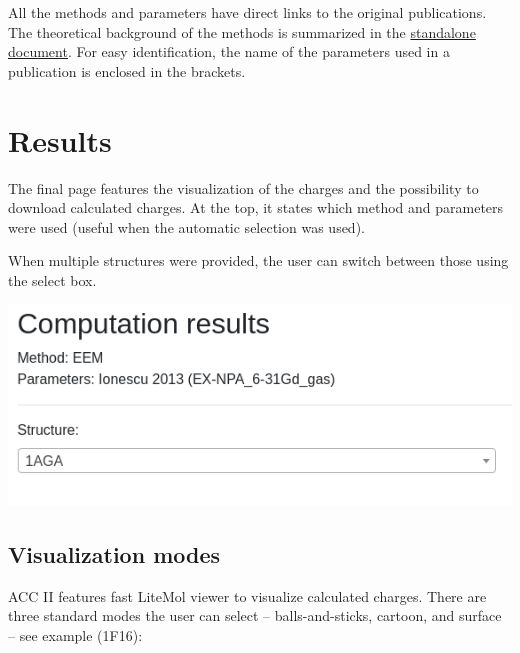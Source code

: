 \documentclass[oneside]{memoir}
\begin{document}
All the methods and parameters have direct links to the original publications. The theoretical background of the methods is summarized in the \href{https://acc2.ncbr.muni.cz/static/methods.pdf}{standalone document}. For easy identification, the name of the parameters used in a publication is enclosed in the brackets.

\section*{Results}
The final page features the visualization of the charges and the possibility to download calculated charges. At the top, it states which method and parameters were used (useful when the automatic selection was used).

When multiple structures were provided, the user can switch between those using the select box.

\begin{center}
    \includegraphics[width=.5\linewidth]{images/select.png}
\end{center}

\subsection*{Visualization modes}
ACC II features fast LiteMol viewer to visualize calculated charges. There are three standard modes the user can select – balls-and-sticks, cartoon, and surface –  see example (1F16):
\end{document}
